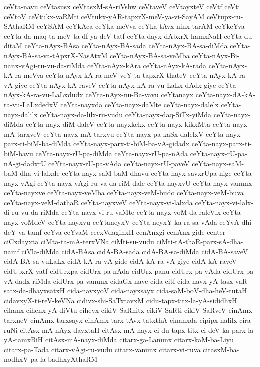 {ceVta-navu
ceVtasusx
ceVtasxM-sA-riVshw
ceVtaveV
ceVtayxteV
ceVtf
ceVti
ceVtoV
ceVtukx-vaRMti
ceVtukx-yAR-tapxrX-meV-ya-vi-SayAM
ceVtupx-ru-SAthaRM
ceYSAM
ceYkAca
ceYka-meVva
ceYka-tAvx-ninx-tarAM
ceYkeYva
ceYta-da-maq-ta-meV-ta-df-ya-deV-tatf
ceYta-dayx-dAbxrX-hamxNaH
ceYta-du-ditaM
ceYta-nAyx-BAsa
ceYta-nAyx-BA-sada
ceYta-nAyx-BA-sa-diMda
ceYta-nAyx-BA-sa-va-tApxrX-NasAtxM
ceYta-nAyx-BA-sa-veMba
ceYta-nAyx-Bi-nanx-vAgi-ru-vu-da-riMda
ceYta-nAyx-kAra
ceYta-nAyx-kA-rada
ceYta-nAyx-kA-ra-meVva
ceYta-nAyx-kA-ra-meV-veY-ta-tapxrX-thateV
ceYta-nAyx-kA-ra-vA-giye
ceYta-nAyx-kA-raveV
ceYta-nAyx-kA-ra-vu-LaLx-dAdx-giye
ceYta-nAyx-kA-ra-vu-LaLxdudx
ceYta-nAyx-nu-Ba-vavu
ceYtanayx
ceYta-nayx-dA-kA-ra-vu-LaLxdedxV
ceYta-nayxda
ceYta-nayx-daMte
ceYta-nayx-dalelx
ceYta-nayx-dalilx
ceYta-nayx-da-lilx-ru-vudu
ceYta-nayx-daq-SiTx-yiMda
ceYta-nayx-diMda
ceYta-nayx-diM-daleV
ceYta-nayxkekx
ceYta-nayx-kikxMta
ceYta-nayx-mA-tarxveV
ceYta-nayx-mA-tarxvu
ceYta-nayx-pa-kaSx-dalelxV
ceYta-nayx-parx-ti-biM-ba-diMda
ceYta-nayx-parx-ti-biM-ba-vA-gidadx
ceYta-nayx-parx-ti-biM-bavu
ceYta-nayx-rU-pa-diMda
ceYta-nayx-rU-pa-nAda
ceYta-nayx-rU-pa-nA-gi-dadxrU
ceYta-nayx-rU-pa-vAda
ceYta-nayx-rU-paveV
ceYta-nayx-saM-baM-dha-vi-lalxde
ceYta-nayx-saM-baM-dhavu
ceYta-nayx-savxrUpa-nige
ceYta-nayx-vAgi
ceYta-nayx-vAgi-ru-va-da-riM-dale
ceYta-nayxvU
ceYta-nayx-vanunx
ceYta-nayxve
ceYta-nayx-veMba
ceYta-nayx-veM-budo
ceYta-nayx-veM-buva
ceYta-nayx-veM-dathaR
ceYta-nayxveV
ceYta-nayx-vi-lalxda
ceYta-nayx-vi-lalx-di-ru-vu-da-riMda
ceYta-nayx-vi-ru-vaMte
ceYta-nayx-voM-da-raleVlx
ceYta-nayx-voMdeV
ceYta-nayxvu
ceYtaneyxV
ceYta-neyxY-ka-ra-sa-vAda
ceYvA-dhi-deY-va-tamf
ceYva
ceYvaM
cecxVdaginxH
cenAnxgi
cenAnx-gide
center
ciCxdayxta
ciMta-ta-mA-terxVNa
ciMti-su-vudu
ciMti-tA-thaR-parx-sA-dha-namf
ciVla-diMda
cidA-BAsa
cidA-BA-sada
cidA-BA-sa-diMda
cidA-BA-saveV
cidA-BA-sa-vuLaLx
cidA-kA-ra-vA-gide
cidA-kA-ra-vA-giye
cidA-kA-raveV
cidUbxrX-yatf
cidUrxpa
cidUrx-pa-nAda
cidUrx-panu
cidUrx-pa-vAda
cidUrx-pa-vA-dadx-riMda
cidUrx-pa-vanunx
cidaGx-nave
cida-citf
cida-navx-yA-tasx-vaR-satx-da-dhayxsatxH
cida-navxyoV
cida-nayxsayx
cida-saM-boV-dha-heV-tutaH
cidavxyX-ti-reV-keVNa
cidivx-shi-SaTxtavxM
cidu-tapx-titx-la-yA-sididhxH
cihanx
cihenx-yA-diVtu
cihevx
cikiV-SaRnitx
cikiV-SaRti
cikiV-SaRveV
cinAmx-tarxneV
cinAmx-tarxsayx
cinAmx-tarx-tAvx-tatxthA
cinanxda
cipipx-nalilx
cira-ruNi
citAsx-mA-nAyx-dayxtaH
citAsx-mA-nayx-ci-du-tapx-titx-ci-deV-ka-parx-la-yA-tamxBiH
citAsx-mA-nayx-diMda
citarx-ga-Lanunx
citarx-kaM-ba-Liyu
citarx-pa-Tada
citarx-vAgi-ru-vudu
citarx-vanunx
citarx-vi-ruva
citasxM-ba-nodhxV-pa-la-badhxyXthaRM
}
